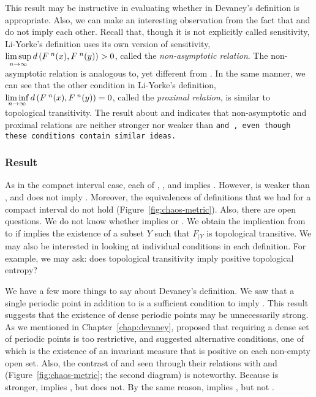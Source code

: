\documentclass[10pt,twoside,draft]{book}
\begin{document}
This result may be instructive in evaluating whether \dpp in Devaney's definition is appropriate.
Also, we can make an interesting observation from the fact that \wig and \liy do not imply each other. 
Recall that, though it is not explicitly called sensitivity, Li-Yorke's definition uses its own version of sensitivity, $\limsup\limits_{n\to \infty} d\left( F^{\;n}(x), F^{\;n}(y) \right) > 0$, called the \textit{non-asymptotic relation}.
The non-asymptotic relation is analogous to, yet different from \sdic.
In the same manner, we can see that the other condition in Li-Yorke's definition, $\liminf\limits_{n\to \infty} d\left( F^{\;n}(x), F^{\;n}(y) \right) = 0$, called the \textit{proximal relation}, is similar to topological transitivity.
The result about \wig and \liy indicates that non-asymptotic and proximal relations are neither stronger nor weaker than \tt and \sdic, even though these conditions contain similar ideas.

\subsubsection*{Result}
As in the compact interval case, each of \dev, \blcp, and \pte implies \liy.
However, \wig is weaker than \dev, and does not imply \liy.
Moreover, the equivalences of definitions that we had for a compact interval do not hold (Figure~\ref{fig:chaos-metric}).
Also, there are open questions.
We do not know whether \pte implies \blcp or \dev.
We obtain the implication from \pte to \wig if \pte implies the existence of a subset $Y$ such that $F_{|Y}$ is topological transitive.
We may also be interested in looking at individual conditions in each definition.
For example, we may ask: does topological transitivity imply positive topological entropy?

We have a few more things to say about Devaney's definition.
We saw that a single periodic point in addition to \wig is a sufficient condition to imply \liy. 
This result suggests that the existence of dense periodic points may be unnecessarily strong.
As we mentioned in Chapter~\ref{chap:devaney}, \citet{glasner} proposed that requiring a dense set of periodic points is too restrictive, and suggested alternative conditions, one of which is the existence of an invariant measure that is positive on each non-empty open set.
Also, the contrast of \dev and \wig seen through their relations with \pte and \liy (Figure~\ref{fig:chaos-metric}; the second diagram) is noteworthy.
Because \dev is stronger, \dev implies \liy, but \wig does not.
By the same reason, \blcp implies \wig, but not \dev.
\end{document}

